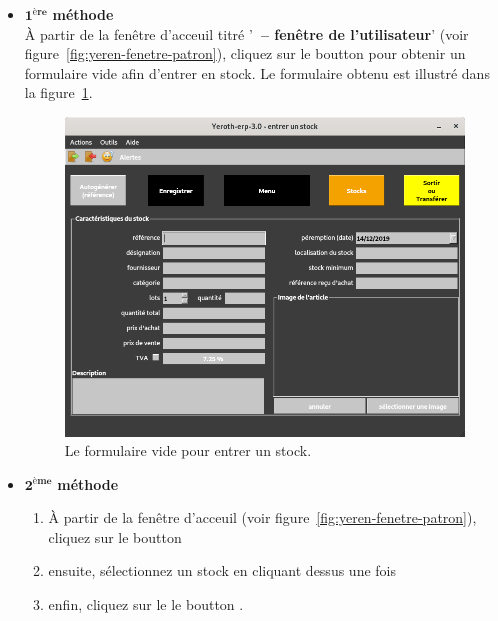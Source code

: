 \begin{itemize}[]
	\item \textcolor{purplish}{$\mathbf{1^{\text{\`ere}}}$ \textbf{m\'ethode}}\\
		   \`A partir de la fen\^etre d'acceuil titr\'e
		   '\textbf{\yerotherptitle\ -- fen\^etre de l'utilisateur}'
		   (voir figure~\ref{fig:yeren-fenetre-patron}), cliquez
		   sur le boutton  pour obtenir un
		   formulaire vide afin d'entrer en stock. Le formulaire
		   obtenu est illustr\'e dans la figure~\ref{fig:formulaire-entrer-1}.\\
		   
	      \begin{figure}[!htbp]
		  \centering
		  \includegraphics[scale=0.63]{images/yeren-fenetre-entrer.png}
		  \caption{Le formulaire vide pour entrer un stock.}
		  \label{fig:formulaire-entrer-1}
		  \end{figure}
	      
	      \newpage
	      
	\item \textcolor{purplish}{$\mathbf{2^{\text{\`eme}}}$ \textbf{m\'ethode}}
		\begin{enumerate}[1)]
			\item \`A partir de la fen\^etre d'acceuil
			(voir figure~\ref{fig:yeren-fenetre-patron}),
			cliquez sur le boutton 
			\item ensuite, s\'electionnez un stock en cliquant dessus une fois
			\item enfin, cliquez sur le le boutton .\\
		\end{enumerate}				
		

\end{itemize}

